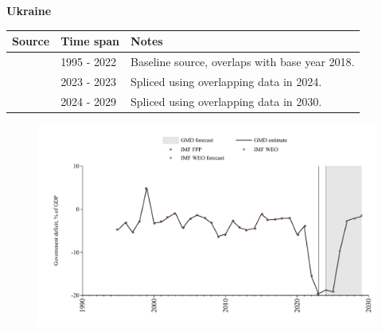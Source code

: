 \documentclass[12pt,a4paper,landscape]{article}
\begin{document}
\begin{adjustbox}{max totalsize={\paperwidth}{\paperheight},center}
\begin{minipage}[t][\textheight][t]{\textwidth}
\vspace*{0.5cm}
{}
\begin{center}
{\Large\bfseries Ukraine}
\end{center}
\vspace{0.5cm}
\begin{table}[H]
\centering
\small
\begin{tabular}{|l|l|l|}
\hline
\textbf{Source} & \textbf{Time span} & \textbf{Notes} \\
\hline
\rowcolor{white}\cite{IMF_WEO}& 1995 - 2022 &Baseline source, overlaps with base year 2018.\\
\rowcolor{lightgray}\cite{IMF_FPP}& 2023 - 2023 &Spliced using overlapping data in 2024.\\
\rowcolor{white}\cite{IMF_WEO_forecast}& 2024 - 2029 &Spliced using overlapping data in 2030.\\
\hline
\end{tabular}
\end{table}
\begin{figure}[H]
\centering
\includegraphics[width=\textwidth,height=0.6\textheight,keepaspectratio]{graphs/UKR_govdef_GDP.pdf}
\end{figure}
\end{minipage}
\end{adjustbox}
\end{document}
